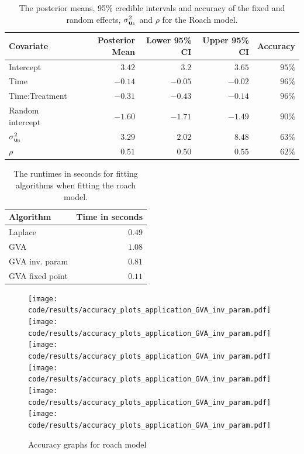 		
\begin{table}
	\begin{tabular}{|l|rrrr|}
		\hline
		Covariate          & Posterior Mean & Lower 95\% CI & Upper 95\% CI & Accuracy \\
		\hline
		Intercept          & $3.42$						& $3.2$ 					& $3.65$          & $95\%$     \\
		Time               & $-0.14$        & $-0.05$       & $-0.02$       & $96\%$     \\
		Time:Treatment     & $-0.31$        & $-0.43$       & $-0.14$       & $96\%$     \\
		Random intercept   & $-1.60$        & $-1.71$       & $-1.49$       & $90\%$     \\
		$\sigma^2_{{\bf u}_1}$ & $3.29$           & $2.02$          & $8.48$          & $63\%$     \\
		$\rho$             & $0.51$           & $0.50$          & $0.55$          & $62\%$     \\
		\hline
	\end{tabular}
	\caption{The posterior means, 95\% credible intervals and accuracy of the fixed and random
						effects, $\sigma_{{\bf u}_1}^2$ and $\rho$ for the Roach model.}
	\label{tab:application_roaches}
\end{table}

\begin{table}
	\begin{tabular}{|lr|}
	\hline
	Algorithm & Time in seconds \\
	\hline
	Laplace & $0.49$ \\
	GVA & $1.08$ \\
	GVA inv. param & $0.81$ \\
	GVA fixed point & $0.11$ \\
	\hline
	\end{tabular}
	\label{tab:application_roaches_runtime}
	\caption{The runtimes in seconds for fitting algorithms when fitting the roach model.}
\end{table}
		
\begin{figure}[h]
	\centering
	\texttt{[image: code/results/accuracy\_plots\_application\_GVA\_inv\_param.pdf]}
	\texttt{[image: code/results/accuracy\_plots\_application\_GVA\_inv\_param.pdf]}
	\texttt{[image: code/results/accuracy\_plots\_application\_GVA\_inv\_param.pdf]}
	\texttt{[image: code/results/accuracy\_plots\_application\_GVA\_inv\_param.pdf]}
	\texttt{[image: code/results/accuracy\_plots\_application\_GVA\_inv\_param.pdf]}
	\texttt{[image: code/results/accuracy\_plots\_application\_GVA\_inv\_param.pdf]}
	\caption{Accuracy graphs for roach model}
	\label{fig:accuracy_roach}
\end{figure}
		
